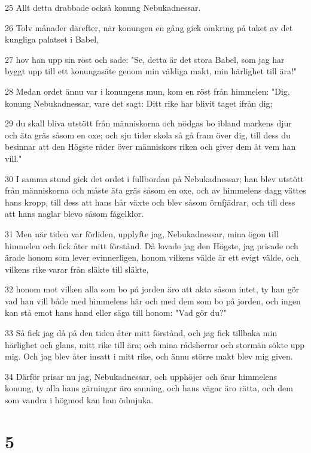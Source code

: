 \par 25 Allt detta drabbade också konung Nebukadnessar.
\par 26 Tolv månader därefter, när konungen en gång gick omkring på taket av det kungliga palatset i Babel,
\par 27 hov han upp sin röst och sade: "Se, detta är det stora Babel, som jag har byggt upp till ett konungasäte genom min väldiga makt, min härlighet till ära!"
\par 28 Medan ordet ännu var i konungens mun, kom en röst från himmelen: "Dig, konung Nebukadnessar, vare det sagt: Ditt rike har blivit taget ifrån dig;
\par 29 du skall bliva utstött från människorna och nödgas bo ibland markens djur och äta gräs såsom en oxe; och sju tider skola så gå fram över dig, till dess du besinnar att den Högste råder över människors riken och giver dem åt vem han vill."
\par 30 I samma stund gick det ordet i fullbordan på Nebukadnessar; han blev utstött från människorna och måste äta gräs såsom en oxe, och av himmelens dagg vättes hans kropp, till dess att hans hår växte och blev såsom örnfjädrar, och till dess att hans naglar blevo såsom fågelklor.
\par 31 Men när tiden var förliden, upplyfte jag, Nebukadnessar, mina ögon till himmelen och fick åter mitt förstånd. Då lovade jag den Högste, jag prisade och ärade honom som lever evinnerligen, honom vilkens välde är ett evigt välde, och vilkens rike varar från släkte till släkte,
\par 32 honom mot vilken alla som bo på jorden äro att akta såsom intet, ty han gör vad han vill både med himmelens här och med dem som bo på jorden, och ingen kan stå emot hans hand eller säga till honom: "Vad gör du?"
\par 33 Så fick jag då på den tiden åter mitt förstånd, och jag fick tillbaka min härlighet och glans, mitt rike till ära; och mina rådsherrar och stormän sökte upp mig. Och jag blev åter insatt i mitt rike, och ännu större makt blev mig given.
\par 34 Därför prisar nu jag, Nebukadnessar, och upphöjer och ärar himmelens konung, ty alla hans gärningar äro sanning, och hans vägar äro rätta, och dem som vandra i högmod kan han ödmjuka.

\chapter{5}

